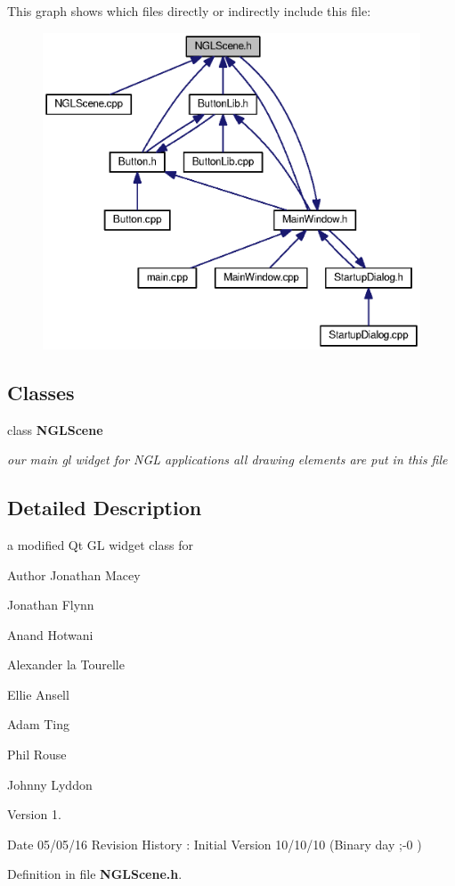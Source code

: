 This graph shows which files directly or indirectly include this file\-:\nopagebreak
\begin{figure}[H]
\begin{center}
\leavevmode
\includegraphics[width=350pt]{_n_g_l_scene_8h__dep__incl}
\end{center}
\end{figure}
\subsection*{Classes}
\begin{DoxyCompactItemize}
\item 
class {\bf N\-G\-L\-Scene}
\begin{DoxyCompactList}\small\item\em our main gl widget for N\-G\-L applications all drawing elements are put in this file \end{DoxyCompactList}\end{DoxyCompactItemize}


\subsection{Detailed Description}
a modified Qt G\-L widget class for \begin{DoxyAuthor}{Author}
Jonathan Macey 

Jonathan Flynn 

Anand Hotwani 

Alexander la Tourelle 

Ellie Ansell 

Adam Ting 

Phil Rouse 

Johnny Lyddon 
\end{DoxyAuthor}
\begin{DoxyVersion}{Version}
1. 
\end{DoxyVersion}
\begin{DoxyDate}{Date}
05/05/16 Revision History \-: Initial Version 10/10/10 (Binary day ;-\/0 ) 
\end{DoxyDate}


Definition in file {\bf N\-G\-L\-Scene.\-h}.

